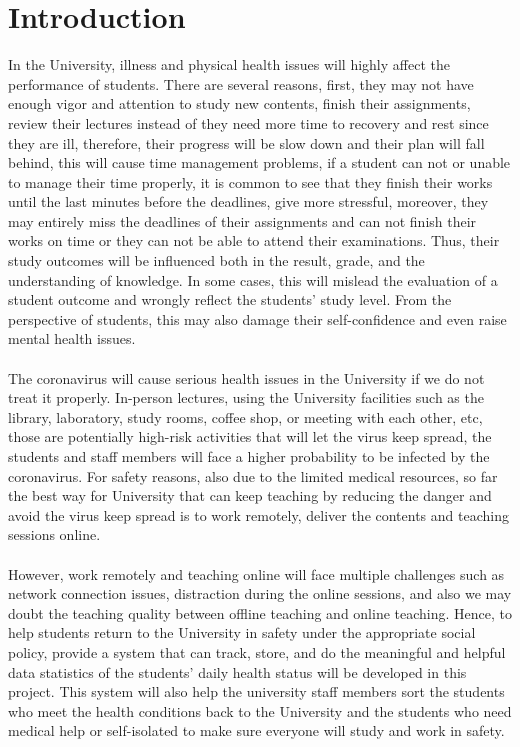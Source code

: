 \documentclass[12pt]{article}
\begin{document}
\section{Introduction}
In the University, illness and physical health issues will highly affect the performance of students. There are several reasons, first, they may not have enough vigor and attention to study new contents, finish their assignments, review their lectures instead of they need more time to recovery and rest since they are ill, therefore, their progress will be slow down and their plan will fall behind, this will cause time management problems, if a student can not or unable to manage their time properly, it is common to see that they finish their works until the last minutes before the deadlines, give more stressful, moreover, they may entirely miss the deadlines of their assignments and can not finish their works on time or they can not be able to attend their examinations. Thus, their study outcomes will be influenced both in the result, grade, and the understanding of knowledge. In some cases, this will mislead the evaluation of a student outcome and wrongly reflect the students’ study level. From the perspective of students, this may also damage their self-confidence and even raise mental health issues. 
\\
\\The coronavirus will cause serious health issues in the University if we do not treat it properly. In-person lectures, using the University facilities such as the library, laboratory, study rooms, coffee shop, or meeting with each other, etc, those are potentially high-risk activities that will let the virus keep spread, the students and staff members will face a higher probability to be infected by the coronavirus. For safety reasons, also due to the limited medical resources, so far the best way for University that can keep teaching by reducing the danger and avoid the virus keep spread is to work remotely, deliver the contents and teaching sessions online.
\\
\\However, work remotely and teaching online will face multiple challenges such as network connection issues, distraction during the online sessions, and also we may doubt the teaching quality between offline teaching and online teaching. Hence, to help students return to the University in safety under the appropriate social policy, provide a system that can track, store, and do the meaningful and helpful data statistics of the students’ daily health status will be developed in this project. This system will also help the university staff members sort the students who meet the health conditions back to the University and the students who need medical help or self-isolated to make sure everyone will study and work in safety.
\end{document}
